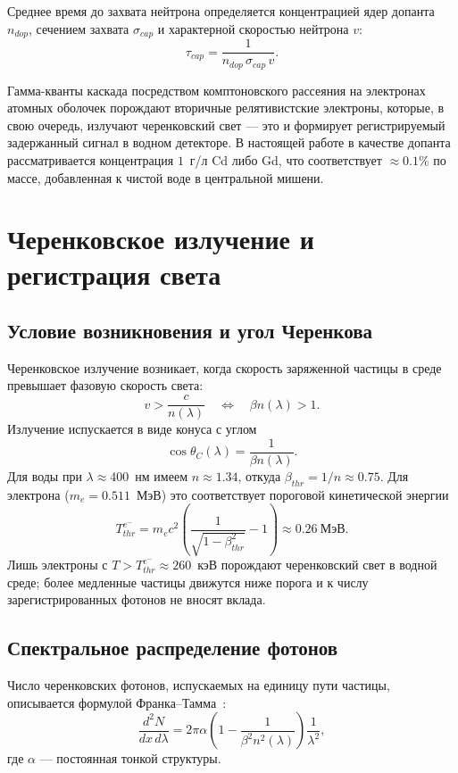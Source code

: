 \documentclass[a4paper,12pt]{extarticle}
\begin{document}
Среднее время до захвата нейтрона определяется концентрацией ядер допанта $n_{dop}$, сечением захвата $\sigma_{cap}$ и характерной скоростью нейтрона $v$:
\begin{equation}
    \tau_{cap}=\frac{1}{n_{dop}\,\sigma_{cap}\,v}.
\label{eq:tau_cap}
\end{equation}

Гамма-кванты каскада посредством комптоновского рассеяния на электронах атомных оболочек порождают вторичные релятивистские электроны, которые, в свою очередь, излучают черенковский свет — это и формирует регистрируемый задержанный сигнал в водном детекторе. В настоящей работе в качестве допанта рассматривается концентрация $1$~г/л Cd либо Gd, что соответствует $\approx 0.1\%$ по массе, добавленная к чистой воде в центральной мишени.

\section{Черенковское излучение и регистрация света}

\subsection{Условие возникновения и угол Черенкова}
Черенковское излучение возникает, когда скорость заряженной частицы в среде превышает фазовую скорость света:
\begin{equation}
    v>\frac{c}{n(\lambda)}\quad \Leftrightarrow\quad \beta n(\lambda)>1.
\end{equation}
Излучение испускается в виде конуса с углом
\begin{equation}
    \cos\theta_C(\lambda)=\frac{1}{\beta n(\lambda)}.
\end{equation}
Для воды при $\lambda\approx 400$~нм имеем $n\approx 1.34$, откуда $\beta_{thr}=1/n\approx 0.75$. Для электрона ($m_e=0.511$~МэВ) это соответствует пороговой кинетической энергии
\begin{equation}
    T^{e^-}_{thr}=m_ec^2\!\left(\frac{1}{\sqrt{1-\beta_{thr}^2}}-1\right)\approx 0.26~\text{МэВ}.
    \label{eq:cher_thr}
\end{equation}
Лишь электроны с $T>T^{e^-}_{thr}\approx 260$~кэВ порождают черенковский свет в водной среде; более медленные частицы движутся ниже порога и к числу зарегистрированных фотонов не вносят вклада.

\subsection{Спектральное распределение фотонов}
Число черенковских фотонов, испускаемых на единицу пути частицы, описывается формулой Франка–Тамма~\cite{jelley1958}:
\begin{equation}
    \frac{d^2N}{dx\,d\lambda}=2\pi\alpha\left(1-\frac{1}{\beta^2 n^2(\lambda)}\right)\frac{1}{\lambda^2},
\end{equation}
где $\alpha$ — постоянная тонкой структуры.
\end{document}
